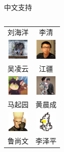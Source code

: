 \begin{frame}{中文支持}
\begin{columns}
\begin{column}{0.33\textwidth}
\begin{tabular}{cc}
    刘海洋 & 李清 \\[2ex]
    \includegraphics[width=1cm]{figures/wulingyun.jpg}     &
    \includegraphics[width=1cm]{figures/jjgod.jpg}         \\
    吴凌云 & 江疆 \\[2ex]
    \includegraphics[width=1cm]{figures/li-a-ling.jpg}     &
    \includegraphics[width=1cm]{figures/liam-huang.jpg}    \\
    马起园 & 黄晨成 \\[2ex]
    \includegraphics[width=1cm]{figures/louisstuart96.jpg} &
    \includegraphics[width=1cm]{figures/zepinglee.jpg}     \\
    鲁尚文 & 李泽平
  \end{tabular}
\end{column}
\end{columns}
\end{frame}

